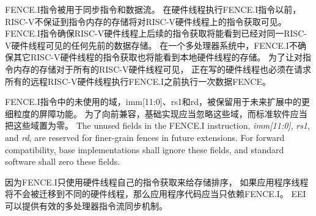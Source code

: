 FENCE.I指令被用于同步指令和数据流。
在硬件线程执行FENCE.I指令以前，RISC-V不保证到指令内存的存储将对RISC-V硬件线程上的指令获取可见。
FENCE.I指令确保RISC-V硬件线程上后续的指令获取将能看到已经对同一RISC-V硬件线程可见的任何先前的数据存储。
在一个多处理器系统中，FENCE.I不确保其它RISC-V硬件线程的指令获取也将能看到本地硬件线程的存储。
为了让对指令内存的存储对于所有的RISC-V硬件线程可见，
正在写的硬件线程也必须在请求所有的远程RISC-V硬件线程执行FENCE.I之前执行一次数据FENCE。

FENCE.I指令中的未使用的域，imm[11:0]、rs1和rd，被保留用于未来扩展中的更细粒度的屏障功能。
为了向前兼容，基础实现应当忽略这些域，而标准软件应当把这些域置为零。
The unused fields in the FENCE.I instruction, {\em imm[11:0]}, {\em rs1}, and
{\em rd}, are reserved for finer-grain fences in future extensions.  For
forward compatibility, base implementations shall ignore these fields, and
standard software shall zero these fields.

\begin{commentary}
因为FENCE.I只使用硬件线程自己的指令获取来给存储排序，
如果应用程序线程将不会被迁移到不同的硬件线程，那么应用程序代码应当只依赖FENCE.I。
EEI可以提供有效的多处理器指令流同步机制。
\end{commentary}


